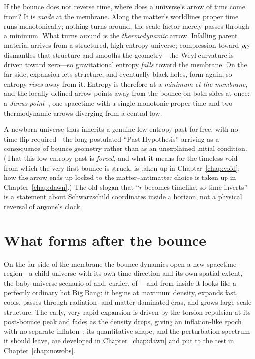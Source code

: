If the bounce does not reverse time, where does a universe's arrow of time come
from? It is \emph{made} at the membrane. Along the matter's worldlines proper
time runs monotonically; nothing turns around, the scale factor merely passes
through a minimum. What turns around is the \emph{thermodynamic} arrow. Infalling
parent material arrives from a structured, high-entropy universe; compression
toward $\rho_{C}$ dismantles that structure and smooths the geometry---the Weyl
curvature is driven toward zero---so gravitational entropy \emph{falls} toward the
membrane. On the far side, expansion lets structure, and eventually black holes,
form again, so entropy \emph{rises} away from it. Entropy is therefore at a
\emph{minimum at the membrane}, and the locally defined arrow points away from the
bounce on both sides at once: a \emph{Janus point}~\citep{barbour2014}, one
spacetime with a single monotonic proper time and two thermodynamic arrows
diverging from a central low.

A newborn universe thus inherits a genuine low-entropy past for free, with no time
flip required---the long-postulated ``Past Hypothesis'' arriving as a consequence
of bounce geometry rather than as an unexplained initial condition. (That this
low-entropy past is \emph{forced}, and what it means for the timeless void from
which the very first bounce is struck, is taken up in Chapter~\ref{chap:void}; how
the arrow ends up locked to the matter--antimatter choice is taken up in
Chapter~\ref{chap:dawn}.) The old slogan that ``$r$ becomes timelike, so time
inverts'' is a statement about Schwarzschild coordinates inside a horizon, not a
physical reversal of anyone's clock.

\section{What forms after the bounce}

On the far side of the membrane the bounce dynamics open a new spacetime
region---a child universe with its own time direction and its own spatial
extent, the baby-universe scenario of \citet{poplawski2016} and, earlier, of
\citet{frolov1990}---and from inside
it looks like a perfectly ordinary hot Big Bang: it
begins at maximum density, expands fast, cools, passes through radiation- and
matter-dominated eras, and grows large-scale structure. The early, very rapid
expansion is driven by the torsion repulsion at its post-bounce peak and fades as
the density drops, giving an inflation-like epoch with no separate
inflaton~\citep{linde1982}; its
quantitative shape, and the perturbation spectrum it should leave, are developed
in Chapter~\ref{chap:dawn} and put to the test in Chapter~\ref{chap:nowobs}.


